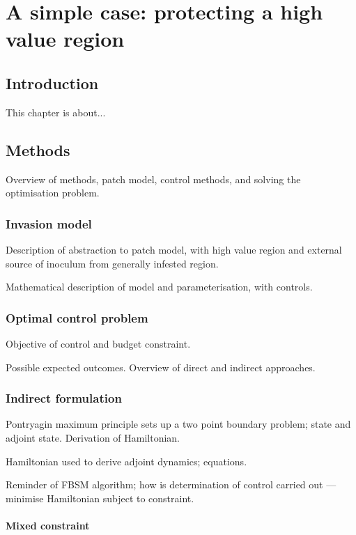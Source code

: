 %
\chapter{A simple case: protecting a high value region}\label{ch:three_patch}

\section{Introduction}\label{sec:ch3:intro}

This chapter is about...

\section{Methods}

Overview of methods, patch model, control methods, and solving the optimisation problem.

\subsection{Invasion model}

Description of abstraction to patch model, with high value region and external source of inoculum from generally infested region.

Mathematical description of model and parameterisation, with controls.

\subsection{Optimal control problem}

Objective of control and budget constraint.

Possible expected outcomes. Overview of direct and indirect approaches.

\subsection{Indirect formulation}

Pontryagin maximum principle sets up a two point boundary problem; state and adjoint state. Derivation of Hamiltonian.

Hamiltonian used to derive adjoint dynamics; equations.

Reminder of FBSM algorithm; how is determination of control carried out --- minimise Hamiltonian subject to constraint.

\subsubsection{Mixed constraint}

